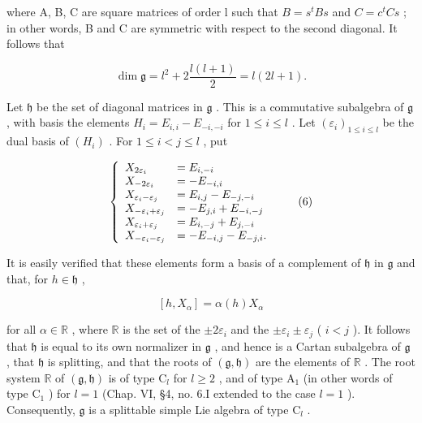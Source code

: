 where A, B, C are square matrices of order l such that \(B = s^{t}Bs\) and \(C = c^{t}Cs\) ; in other words, B and C are symmetric with respect to the second diagonal. It follows that

\[
\dim \mathfrak {g} = l ^ {2} + 2 \frac {l (l + 1)}{2} = l (2 l + 1).
\]

Let \(\mathfrak{h}\) be the set of diagonal matrices in \(\mathfrak{g}\) . This is a commutative subalgebra of \(\mathfrak{g}\) , with basis the elements \(H_{i} = E_{i,i} - E_{-i,-i}\) for \(1 \leq i \leq l\) . Let \((\varepsilon_{i})_{1 \leq i \leq l}\) be the dual basis of \((H_{i})\) . For \(1 \leq i < j \leq l\) , put

\[
\left\{ \begin{array}{l l} X _ {2 \varepsilon_ {i}} & = E _ {i, - i} \\ X _ {- 2 \varepsilon_ {i}} & = - E _ {- i, i} \\ X _ {\varepsilon_ {i} - \varepsilon_ {j}} & = E _ {i, j} - E _ {- j, - i} \\ X _ {- \varepsilon_ {i} + \varepsilon_ {j}} & = - E _ {j, i} + E _ {- i, - j} \\ X _ {\varepsilon_ {i} + \varepsilon_ {j}} & = E _ {i, - j} + E _ {j, - i} \\ X _ {- \varepsilon_ {i} - \varepsilon_ {j}} & = - E _ {- i, j} - E _ {- j, i}. \end{array} \right.\tag{6}
\]

It is easily verified that these elements form a basis of a complement of \(\mathfrak{h}\) in \(\mathfrak{g}\) and that, for \(h\in \mathfrak{h}\) ,

\[
[ h, X _ {\alpha} ] = \alpha (h) X _ {\alpha}\tag{7}
\]

for all \(\alpha \in \mathbb{R}\) , where \(\mathbb{R}\) is the set of the \(\pm 2\varepsilon_{i}\) and the \(\pm \varepsilon_{i} \pm \varepsilon_{j}\) ( \(i < j\) ). It follows that \(\mathfrak{h}\) is equal to its own normalizer in \(\mathfrak{g}\) , and hence is a Cartan subalgebra of \(\mathfrak{g}\) , that \(\mathfrak{h}\) is splitting, and that the roots of \((\mathfrak{g}, \mathfrak{h})\) are the elements of \(\mathbb{R}\) . The root system \(\mathbb{R}\) of \((\mathfrak{g}, \mathfrak{h})\) is of type \(\mathrm{C}_{l}\) for \(l \geq 2\) , and of type \(\mathrm{A}_{1}\) (in other words of type \(\mathrm{C}_{1}\) ) for \(l = 1\) (Chap. VI, §4, no. 6.I extended to the case \(l = 1\) ). Consequently, \(\mathfrak{g}\) is a splittable simple Lie algebra of type \(\mathrm{C}_{l}\) .

